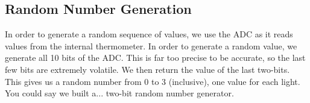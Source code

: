 \documentclass{article}
\begin{document}
    \subsection{Random Number Generation}
    
    In order to generate a random sequence of values, we use the ADC as it reads values from the internal thermometer. In order to generate a random value, we generate all 10 bits of the ADC. This is far too precise to be accurate, so the last few bits are extremely volatile. We then return the value of the last two-bits. This gives us a random number from 0 to 3 (inclusive), one value for each light. You could say we built a... two-bit random number generator.
\end{document}
